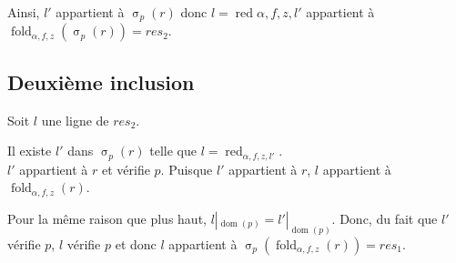\documentclass[french]{article}
\DeclareMathOperator{\sel}{\sigma}
\DeclareMathOperator{\dom}{dom}
\DeclareMathOperator{\redu}{red}
\newcommand{\selP}{\sel_p}
\newcommand{\fold}[3]{\operatorname{fold}_{#1, #2, #3}}
\newcommand{\foldAlphafz}{\fold{\alpha}{f}{z}}
\begin{document}
Ainsi, $l'$ appartient à $\selP(r)$ donc
$l = \redu{\alpha, f, z, l'}$ appartient
à $\foldAlphafz(\selP(r)) = res_2$.

\subsection*{Deuxième inclusion}
Soit $l$ une ligne de $res_2$.

Il existe $l'$ dans $\selP(r)$ telle que
$l = \redu_{\alpha, f, z, l'}$. \\

$l'$ appartient à $r$ et vérifie $p$.
Puisque $l'$ appartient à $r$,
$l$ appartient à $\foldAlphafz(r)$.

Pour la même raison que plus haut, $l|_{\dom(p)} = l'|_{\dom(p)}$.
Donc, du fait que $l'$ vérifie $p$, $l$ vérifie $p$ et donc
$l$ appartient à $\selP(\foldAlphafz(r)) = res_1$.
\end{document}
